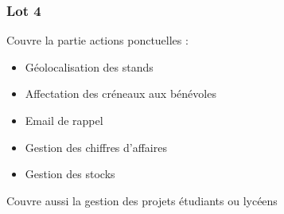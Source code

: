\begin{frame}
	\frametitle{Lot 4}
	Couvre la partie actions ponctuelles :
	\begin{itemize}
		\item Géolocalisation des stands
		\item Affectation des créneaux aux bénévoles
		\item Email de rappel
		\item Gestion des chiffres d'affaires
		\item Gestion des stocks
	\end{itemize}
	Couvre aussi la gestion des projets étudiants ou lycéens
\end{frame}